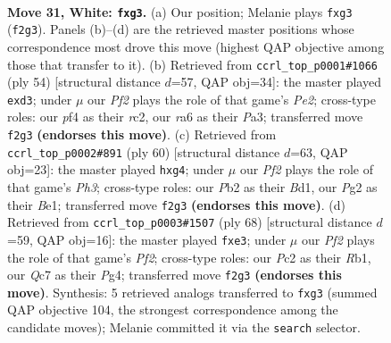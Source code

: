 \documentclass[11pt]{article}
\begin{document}
\clearpage

\begin{figure}[p]\centering
\begin{subfigure}{0.46\textwidth}\centering
\resizebox{\linewidth}{!}{%
\newchessgame
\chessboard[
  setfen={8/2Qn1k2/r7/pb1Pp3/5p2/6p1/PPP2PP1/2R1K3 w - - 0 31},
  showmover=false,
  pgfstyle=straightmove, color=movearrow, markmove={f2-g3}
]}
\caption{}
\end{subfigure}\hfill
\begin{subfigure}{0.46\textwidth}\centering
\resizebox{\linewidth}{!}{%
\newchessgame
\chessboard[
  setfen={8/4kppp/B7/p4b2/P5P1/P2p1P2/2r1P2P/R4K2 w - - 0 28},
  showmover=false,
  pgfstyle=straightmove, color=movearrow, markmove={e2-d3}
]}
\caption{}
\end{subfigure}
\\[4pt]
\begin{subfigure}{0.46\textwidth}\centering
\resizebox{\linewidth}{!}{%
\newchessgame
\chessboard[
  setfen={1r4k1/2pb2p1/R1np4/2p5/5Pp1/1P5P/2P5/3BB1K1 w - - 0 31},
  showmover=false,
  pgfstyle=straightmove, color=movearrow, markmove={h3-g4}
]}
\caption{}
\end{subfigure}\hfill
\begin{subfigure}{0.46\textwidth}\centering
\resizebox{\linewidth}{!}{%
\newchessgame
\chessboard[
  setfen={7k/4n2p/8/2br4/P4pP1/2P1p3/5PP1/1R2R2K w - - 0 35},
  showmover=false,
  pgfstyle=straightmove, color=movearrow, markmove={f2-e3}
]}
\caption{}
\end{subfigure}
\caption{\textbf{Move 31, White: \texttt{fxg3}.} (a) Our position; Melanie plays \texttt{fxg3} (\texttt{f2g3}). Panels (b)--(d) are the retrieved master positions whose correspondence most drove this move (highest QAP objective among those that transfer to it). (b) Retrieved from \texttt{ccrl\_top\_p0001\#1066} (ply 54) [structural distance $d$=57, QAP obj=34]: the master played \texttt{exd3}; under $\mu$ our \emph{Pf2} plays the role of that game's \emph{Pe2}; cross-type roles: our \emph{p}f4 as their \emph{r}c2, our \emph{r}a6 as their \emph{P}a3; transferred move \texttt{f2g3} \textbf{(endorses this move)}. (c) Retrieved from \texttt{ccrl\_top\_p0002\#891} (ply 60) [structural distance $d$=63, QAP obj=23]: the master played \texttt{hxg4}; under $\mu$ our \emph{Pf2} plays the role of that game's \emph{Ph3}; cross-type roles: our \emph{P}b2 as their \emph{B}d1, our \emph{P}g2 as their \emph{B}e1; transferred move \texttt{f2g3} \textbf{(endorses this move)}. (d) Retrieved from \texttt{ccrl\_top\_p0003\#1507} (ply 68) [structural distance $d$=59, QAP obj=16]: the master played \texttt{fxe3}; under $\mu$ our \emph{Pf2} plays the role of that game's \emph{Pf2}; cross-type roles: our \emph{P}c2 as their \emph{R}b1, our \emph{Q}c7 as their \emph{P}g4; transferred move \texttt{f2g3} \textbf{(endorses this move)}. Synthesis: 5 retrieved analogs transferred to \texttt{fxg3} (summed QAP objective 104, the strongest correspondence among the candidate moves); Melanie committed it via the \texttt{search} selector.}
\label{fig:thought-m60}
\end{figure}
\end{document}
